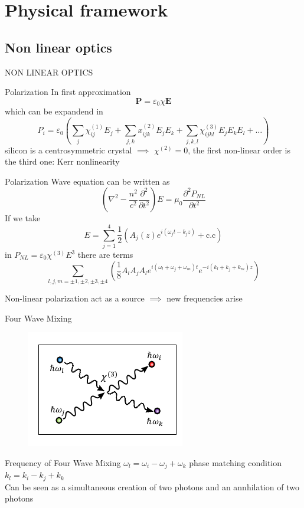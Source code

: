 \documentclass{beamer}
\begin{document}
\section{Physical framework}
\subsection{Non linear optics}
\begin{frame}[plain]
NON LINEAR OPTICS
\end{frame}


\begin{frame}[plain]{Polarization}
In first approximation
\begin{equation}\label{linearP} \mathbf{P} = \varepsilon_0 \chi \mathbf{E}
\end{equation}
which can be expandend in 
\begin{equation}P_i  = \varepsilon_0(\sum_j \chi_{ij}^{(1)} E_j + \sum_{j,k}x_{ijk}^{(2)}E_jE_k + \sum_{j,k,l}\chi_{ijkl}^{(3)}E_jE_kE_l + \dots )\end{equation}
silicon is a centrosymmetric crystal $\implies$ $\chi^{(2)} = 0$, the first non-linear order is the third one: Kerr nonlinearity
\end{frame}


\begin{frame}[plain]{Polarization}
Wave equation can be written as 
\begin{equation}\label{wavesource}\left(\nabla^2 - \frac{n^2}{c^2}\frac{\partial^2}{\partial t^2}\right)E = \mu_0\frac{\partial^2 P_{NL}}{\partial t^2}\end{equation}
If we take \[E = \sum_{j=1}^{4} \frac{1}{2}(A_j(z)e^{i(\omega_jt -k_jz)}+\text{c.c})\] in $P_{NL} = \varepsilon_0\chi^{(3)}E^3$ there are terms
\[\sum_{l,j,m=\pm1,\pm2,\pm3,\pm4}\left(\frac{1}{8}A_lA_jA_l e^{i(\omega_l+\omega_j+\omega_m)t}e^{-i(k_l+k_j+k_m)z}\right)\]

       Non-linear polarization act as a source $\implies$ new frequencies arise

\end{frame}


\begin{frame}[plain]{Four Wave Mixing}
\begin{figure}
\centering
\includegraphics[width = .5\textwidth]{FWMphotons}
\end{figure}
Frequency of Four Wave Mixing $\omega_l = \omega_i - \omega_j +\omega_k$ phase matching condition $k_l = k_i - k_j +k_k$ \\
Can be seen as a simultaneous creation of two photons and an annhilation of two photons

\end{frame}
\end{document}
